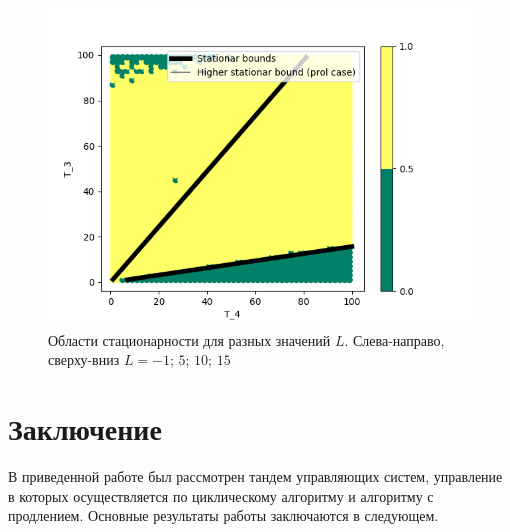 \documentclass[a4paper,12pt,russian]{extarticle}
\begin{document}
\begin{figure}
\begin{multicols}{2}
    \includegraphics[width=1.15\linewidth]{0_1_thres_15_fact.png}\par
\end{multicols}
\caption{Области стационарности для разных значений $L$. Слева-направо, сверху-вниз $L=-1$; $5$; $10$; $15$}
\end{figure}
\newpage
\section{Заключение}
В приведенной работе был рассмотрен тандем управляющих систем, управление в которых осуществляется по циклическому алгоритму и алгоритму с продлением. Основные результаты работы заключаются в следующем.
\end{document}
